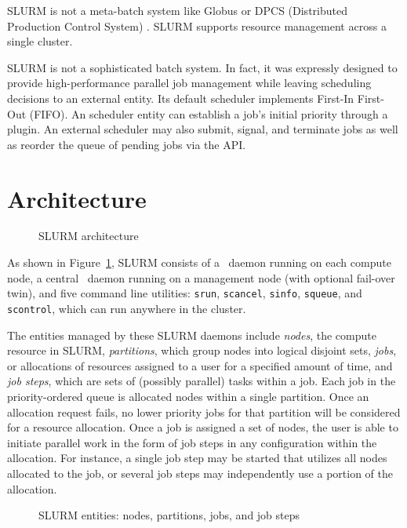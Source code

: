 \documentclass[10pt,onecolumn,times]{../common/llncs}
\begin{document}
{SLURM is not a meta-batch system like Globus \cite{Globus2002} or DPCS
(Distributed Production Control System) \cite{DPCS2002}.  SLURM supports
resource management across a single cluster.

SLURM is not a sophisticated batch system.  In fact, it was expressly
designed to provide high-performance parallel job management while
leaving scheduling decisions to an external entity.  Its default scheduler
implements First-In First-Out (FIFO).  An scheduler entity can establish
a job's initial priority through a plugin.  An external scheduler may
also submit, signal, and terminate jobs as well as reorder the queue of
pending jobs via the API.


\section{Architecture}

\begin{figure}[tb]
\centerline{}
\caption{\small SLURM architecture}
\label{arch}
\end{figure}

As shown in Figure~\ref{arch}, SLURM consists of a \slurmd\ daemon
running on each compute node, a central \slurmctld\ daemon running
on a management node (with optional fail-over twin), and five command
line utilities: {\tt srun}, {\tt scancel}, {\tt sinfo}, {\tt squeue},
and {\tt scontrol}, which can run anywhere in the cluster.

The entities managed by these SLURM daemons include {\em nodes}, the
compute resource in SLURM, {\em partitions}, which group nodes into
logical disjoint sets, {\em jobs}, or allocations of resources assigned
to a user for a specified amount of time, and {\em job steps}, which
are sets of (possibly parallel) tasks within a job.  Each job in the
priority-ordered queue is allocated nodes within a single partition.
Once an allocation request fails, no lower priority jobs for that
partition will be considered for a resource allocation.  Once a job is
assigned a set of nodes, the user is able to initiate parallel work in
the form of job steps in any configuration within the allocation. For
instance, a single job step may be started that utilizes all nodes
allocated to the job, or several job steps may independently use a
portion of the allocation.

\begin{figure}[tcb]
\centerline{}
\caption{\small SLURM entities: nodes, partitions, jobs, and job steps}
\label{entities}
\end{figure}

}
\end{document}
